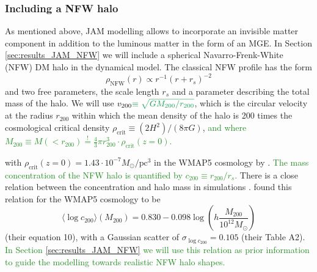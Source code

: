 \documentclass[useAMS,usenatbib]{mnras}
\newcommand{\NEW}[1]{\textcolor{ForestGreen}{#1}}
\newcommand{\OLD}[1]{}
\begin{document}
\subsubsection{Including a NFW halo} \label{sec:model_JAM_NFW}

As mentioned above, JAM modelling allows to incorporate an invisible matter component in addition to the luminous matter in the form of an MGE. In Section \ref{sec:results_JAM_NFW} we will include a spherical Navarro-Frenk-White (NFW) DM halo \citep{1996ApJ...462..563N} in the dynamical model. The classical NFW profile has the form
\begin{equation}
\rho_\text{NFW}(r) \propto r^{-1} \left( r+r_s \right)^{-2} \label{eq:NFWprofile}
\end{equation}
and two free parameters, the scale length $r_s$ and a parameter describing the total mass of the halo. We will use $v_\text{200}\NEW{\equiv \sqrt{GM_{200}/r_{200}}}$, which is the circular velocity at the radius $r_\text{200}$ within which the mean density of the halo is 200 times the cosmological critical density $\rho_\text{crit} \equiv (2H^2)/(8\pi G)$, \OLD{i.e.,}\NEW{ and where $M_{200} \equiv M(<r_{200}) \stackrel{!}{=} \frac 43 \pi r_{200}^3 \cdot \rho_\text{crit}(z=0)$.}
\OLD{\begin{eqnarray*}
M_\text{200} &=& M(<r_{200})\\
\frac{M_{200}}{ \frac 43 \pi r_{200}^3} &=& 200 \rho_\text{crit}(z=0) \\
v_\text{200} &=& \sqrt{\frac{GM_{200}}{r_\text{200}}}
\end{eqnarray*}}
with $\rho_\text{crit}(z=0)=1.43 \cdot 10^{-7} M_\odot / \text{pc}^3$ in the WMAP5 cosmology by \citet{WMAP5cosm}. \OLD{How much the mass is concentrated in the center of the NFW halo is given by the concentration parameter
\begin{equation}
c_{200}\equiv r_{200} / r_s. \label{eq:NFW_c}
\end{equation}}
\NEW{The mass concentration of the NFW halo is quantified by $c_{200}\equiv r_{200} / r_s$.}
There is a close relation between the concentration and halo mass in simulations \citep{1996ApJ...462..563N}. \citet{Maccio08} found this relation for the WMAP5 cosmology to be
\begin{equation}
\langle \log c_{200} \rangle (M_{200}) = 0.830 - 0.098 \log \left(h \frac{M_{200}}{10^{12} M_\odot} \right) \label{eq:Maccio08}
\end{equation}
(their equation 10), with a Gaussian scatter of $\sigma_{\log c_{200}} = 0.105$ (their Table A2). \NEW{In Section \ref{sec:results_JAM_NFW} we will use this relation as prior information to guide the modelling towards realistic NFW halo shapes.}
\end{document}

